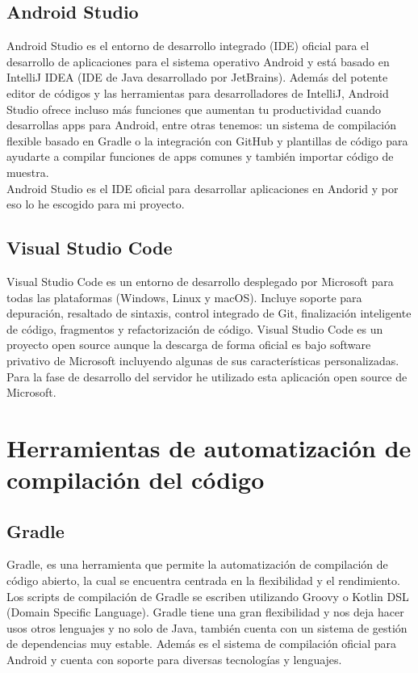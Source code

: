 \subsection{Android Studio}

Android Studio es el entorno de desarrollo integrado (IDE) oficial para el desarrollo de aplicaciones para el sistema operativo Android y está basado en IntelliJ IDEA (IDE de Java desarrollado por JetBrains). Además del potente editor de códigos y las herramientas para desarrolladores de IntelliJ, Android Studio ofrece incluso más funciones que aumentan tu productividad cuando desarrollas apps para Android, entre otras tenemos: un sistema de compilación flexible basado en Gradle o la integración con GitHub y plantillas de código para ayudarte a compilar funciones de apps comunes y también importar código de muestra.\\
Android Studio es el IDE oficial para desarrollar aplicaciones en Andorid y por eso lo he escogido para mi proyecto.

\subsection{Visual Studio Code}

Visual Studio Code es un entorno de desarrollo desplegado por Microsoft para todas las plataformas (Windows, Linux y macOS). Incluye soporte para depuración, resaltado de sintaxis, control integrado de Git, finalización inteligente de código, fragmentos y refactorización de código. Visual Studio Code es un proyecto open source aunque la descarga de forma oficial es bajo software privativo de Microsoft incluyendo algunas de sus características personalizadas.\\ 
Para la fase de desarrollo del servidor he utilizado esta aplicación open source de Microsoft.



\section{Herramientas de automatización de compilación del código}

\subsection{Gradle}

Gradle, es una herramienta que permite la automatización de compilación de código abierto, la cual se encuentra centrada en la flexibilidad y el rendimiento. Los scripts de compilación de Gradle se escriben utilizando Groovy o Kotlin DSL (Domain Specific Language). Gradle tiene una gran flexibilidad y nos deja hacer usos otros lenguajes y no solo de Java, también cuenta con un sistema de gestión de dependencias muy estable. Además es el sistema de compilación oficial para Android y cuenta con soporte para diversas tecnologías y lenguajes.



